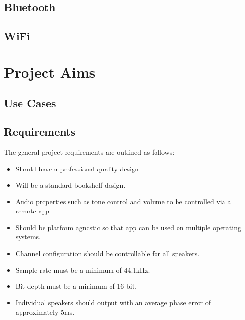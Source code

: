 \documentclass[main.tex]{subfiles}
\begin{document}
\subsection{Bluetooth}
\subsection{WiFi}

\section{Project Aims}
\subsection{Use Cases}
\subsection{Requirements}
The general project requirements are outlined as follows:

\begin{itemize}
    \item Should have a professional quality design.
    \item Will be a standard bookshelf design.
    \item Audio properties such as tone control and volume to be controlled via a remote app.
    \item Should be platform agnostic so that app can be used on multiple operating systems.
    \item Channel configuration should be controllable for all speakers.
    \item Sample rate must be a minimum of 44.1kHz.
    \item Bit depth must be a minimum of 16-bit.
    \item Individual speakers should output with an average phase error of approximately 5ms.
\end{itemize}
\end{document}
